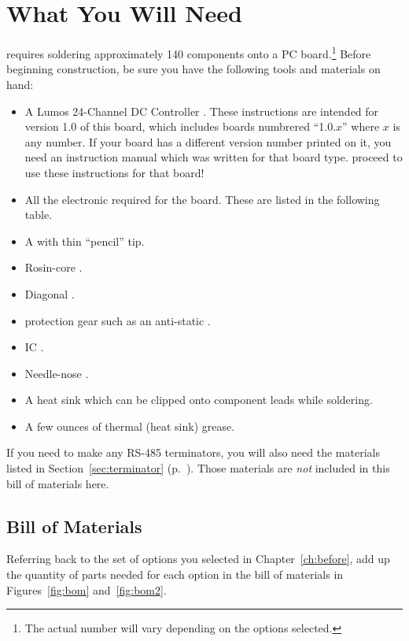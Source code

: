 \documentclass[letterpaper,twoside,onecolumn,openright,final]{memoir}
\begin{document}
\chapter{What You Will Need}\label{ch:materials}
 requires soldering approximately 140 components onto a PC board.\footnote{The actual number will vary depending on the options selected.}  Before beginning construction, be sure you have the following tools and materials on hand:
\begin{itemize}
	\item A Lumos 24-Channel DC Controller . 
		These instructions are intended for version
		1.0 of this board, which includes boards numbrered ``1.0.$x$'' where $x$ is any
		number.  If your board has a different version number printed on it, you need an
		instruction manual which was written for that board type.   proceed to
		use these instructions for that board!
	\item All the electronic  required for the board.  These are listed in the
		following table.
	\item A  with thin ``pencil'' tip.
	\item Rosin-core .  
	\item Diagonal .
	\item {} protection gear such as an anti-static .
	\item IC .
	\item Needle-nose .
	\item A heat sink which can be clipped onto component leads while soldering.
	\item A few ounces of thermal (heat sink) grease.
\end{itemize}

If you need to make any RS-485 terminators, you will also need the materials listed in Section~\ref{sec:terminator} (p.~\pageref{sec:terminator}).  Those materials are \emph{not} included in this bill of materials here.

\section{Bill of Materials}
Referring back to the set of options you selected in Chapter~\ref{ch:before}, add up the quantity of
parts needed for each option in the bill of materials in Figures~\ref{fig:bom}
and~\ref{fig:bom2}.
\end{document}
